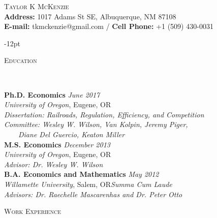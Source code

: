 \documentclass[11pt]{article}
\newenvironment{changemargin}[2]{%
  \begin{list}{}{%
    \setlength{\topsep}{0pt}%
    \setlength{\leftmargin}{#1}%
    \setlength{\rightmargin}{#2}%
    \setlength{\listparindent}{\parindent}%
    \setlength{\itemindent}{\parindent}%
    \setlength{\parsep}{\parskip}%
  }%
  \item[]}{\end{list}
}
\newcommand{\lineover}{
	\begin{changemargin}{-0.05in}{-0.05in}
		\vspace*{-8pt}
		\hrulefill \\
		\vspace*{-2pt}
	\end{changemargin}
}
\newcommand{\header}[1]{
	\begin{changemargin}{-0.5in}{-0.5in}
		\scshape{#1}\\
  	\lineover
	\end{changemargin}
}
\newcommand{\contact}[4]{
	\begin{changemargin}{-0.5in}{-0.5in}
		\begin{center}
			{\Large \scshape {#1}}\\ \smallskip
			{#2}\\ \smallskip 
			{#3}\\ \smallskip
			{#4}\smallskip
		\end{center}
	\end{changemargin}
}
\newenvironment{body} {
	\vspace*{-16pt}
	\begin{changemargin}{-0.25in}{-0.5in}
  }	
	{\end{changemargin}
}
\begin{document}



\contact{Taylor K McKenzie}{ \textbf{Address:} 1017 Adams St SE, Albuquerque, NM 87108}{\textbf{E-mail:} tkmckenzie@gmail.com / \textbf{Cell Phone:} +1 (509) 430-0031}

\vspace{-12pt}
\header{Education}

\begin{body}
	\vspace{14pt}
	\textbf{Ph.D. Economics}{} \hfill \emph{June 2017}{} \\
	\emph{University of Oregon}, Eugene, OR{}\\
	\emph{Dissertation: Railroads, Regulation, Efficiency, and Competition}\\
	\emph{Committee: Wesley W. Wilson, Van Kolpin, Jeremy Piger,}\\
	\ \ \ \ \emph{Diane Del Guercio, Keaton Miller}\\
	\vspace*{0pt}
  \medskip
	\textbf{M.S. Economics}{} \hfill \emph{December 2013}{} \\
	\emph{University of Oregon}, Eugene, OR{}\\
	\emph{Advisor: Dr. Wesley W. Wilson} \\
	\vspace*{0pt}
  \medskip
  	\textbf{B.A. Economics and Mathematics}{} \hfill \emph{May 2012}{} \\
	\emph{Willamette University}, Salem, OR{}\hfill \emph{Summa Cum Laude}{}\\
	\emph{Advisors: Dr. Raechelle Mascarenhas and Dr. Peter Otto} {} \hfill\\
\end{body}
\smallskip
\header{Work Experience}
\end{document}
